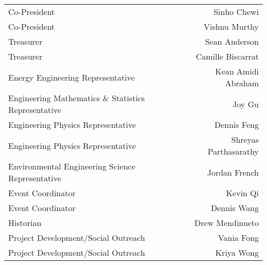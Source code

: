 \begin{tabular}{lr}
  Co-President & Sinho Chewi \\
  Co-President & Vishnu Murthy \\
  Treasurer & Sean Anderson \\
  Treasurer & Camille Biscarrat \\
  Energy Engineering Representative & Kean Amidi Abraham \\
  Engineering Mathematics \& Statistics Representative & Joy Gu \\
  Engineering Physics Representative & Dennis Feng \\
  Engineering Physics Representative & Shreyas Parthasarathy \\
  Environmental Engineering Science Representative & Jordan French \\
  Event Coordinator & Kevin Qi \\
  Event Coordinator & Dennis Wang \\
  Historian & Drew Mendinueto \\
  Project Development/Social Outreach & Vania Fong \\
  Project Development/Social Outreach & Kriya Wong
\end{tabular}

